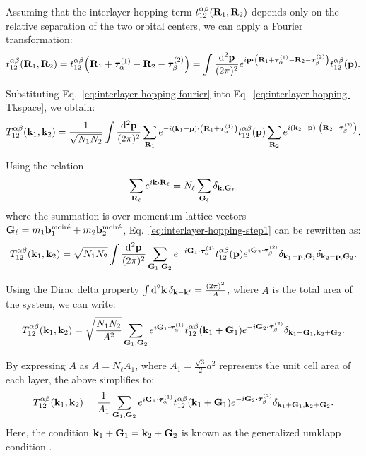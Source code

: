 Assuming that the interlayer hopping term \( t_{12}^{\alpha\beta}({\vb{R}}_1,{\vb{R}}_2) \) depends only on the relative separation of the two orbital centers, we can apply a Fourier transformation:
\begin{equation} \label{eq:interlayer-hopping-fourier}
t_{12}^{\alpha\beta}(\R_1,\R_2) = t_{12}^{\alpha\beta}\qty(\R_1+\vtau_{\alpha}^{(1)}-\R_2-\vtau_{\beta}^{(2)}) =
\int \frac{\dd[2]{\p}}{(2\pi)^2} e^{i \p \vdot \qty(\R_1+\vtau_{\alpha}^{(1)}-\R_2-\vtau_{\beta}^{(2)})} t_{12}^{\alpha\beta}(\p).
\end{equation}

Substituting Eq.~\eqref{eq:interlayer-hopping-fourier} into Eq.~\eqref{eq:interlayer-hopping-Tkspace}, we obtain:
\begin{equation} \label{eq:interlayer-hopping-step1}
T_{12}^{\alpha\beta}(\k_1,\k_2) =
\frac{1}{\sqrt{N_1 N_2}} \int \frac{\dd[2]{\p}}{(2\pi)^2} \sum_{\R_1} e^{-i(\k_1-\p)\vdot\qty(\R_1+\vtau_{\alpha}^{(1)})}
t_{12}^{\alpha\beta}(\p) \sum_{\R_2} e^{i(\k_2-\p)\vdot\qty(\R_2+\vtau_{\beta}^{(2)})}.
\end{equation}

Using the relation
\[
\sum_{\R_\ell} e^{i \k \vdot \R_\ell} = N_\ell \sum_{\G_\ell} \delta_{\k,\G_\ell},
\]
where the summation is over momentum lattice vectors \({\vb{G}}_\ell = m_1 {\vb{b}}_1^{\text{moiré}} + m_2 {\vb{b}}_2^{\text{moiré}}\), Eq.~\eqref{eq:interlayer-hopping-step1} can be rewritten as:
\begin{equation} \label{eq:interlayer-hopping-step2}
T_{12}^{\alpha\beta}(\k_1,\k_2) =
\sqrt{N_1 N_2} \int \frac{\dd[2]{\p}}{(2\pi)^2} \sum_{\G_1, \G_2}
e^{-i \G_1 \vdot \vtau_\alpha^{(1)}} t_{12}^{\alpha\beta}(\p) e^{i \G_2\vdot\vtau_\beta^{(2)}}
\delta_{\k_1-\p, \G_1} \delta_{\k_2-\p, \G_2}.
\end{equation}

Using the Dirac delta property \(\int \dd[2]{{\vb{k}}} \delta_{{\vb{k}}-{\vb{k}}'} = \frac{(2\pi)^2}{A}\), where \(A\) is the total area of the system, we can write:
\begin{equation} \label{eq:interlayer-hopping-step3}
T_{12}^{\alpha\beta}(\k_1,\k_2) =
\sqrt{\frac{N_1 N_2}{A^2}} \sum_{\G_1, \G_2}
e^{i \G_1 \vdot \vtau_\alpha^{(1)}} t_{12}^{\alpha\beta}(\k_1+\G_1) e^{-i \G_2\vdot\vtau_\beta^{(2)}}
\delta_{\k_1+\G_1, \k_2+\G_2}.
\end{equation}

By expressing \(A\) as \(A = N_\ell A_1\), where \(A_1 = \frac{\sqrt{3}}{2} a^2\) represents the unit cell area of each layer, the above simplifies to:
\begin{equation} \label{eq:interlayer-hopping-simplified}
T_{12}^{\alpha\beta}(\k_1,\k_2) = \frac{1}{A_1} \sum_{\G_1, \G_2}
e^{i \G_1 \vdot \vtau_\alpha^{(1)}} t_{12}^{\alpha\beta}(\k_1+\G_1) e^{-i \G_2\vdot\vtau_\beta^{(2)}}
\delta_{\k_1+\G_1, \k_2+\G_2}.
\end{equation}
Here, the condition \({\vb{k}}_1 + {\vb{G}}_1 = {\vb{k}}_2 + {\vb{G}}_2\) is known as the generalized umklapp condition \cite{handbook2019}.


